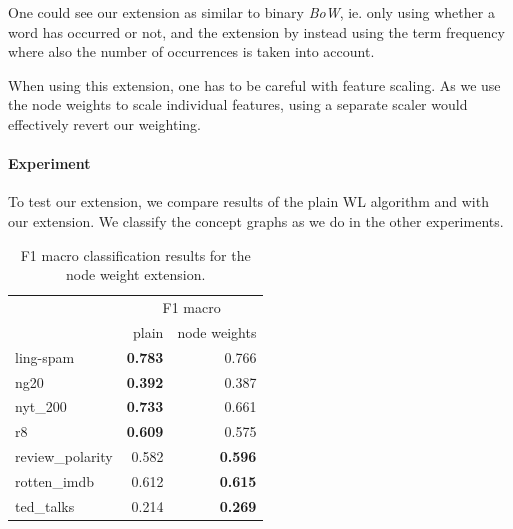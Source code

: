 One could see our extension as similar to binary \textit{BoW}, ie. only using whether a word has occurred or not, and the extension by instead using the term frequency where also the number of occurrences is taken into account.

When using this extension, one has to be careful with feature scaling. As we use the node weights to scale individual features, using a separate scaler would effectively revert our weighting.


\paragraph{Experiment}
To test our extension, we compare results of the plain WL algorithm and with our extension.
We classify the concept graphs as we do in the other experiments.

\begin{table}[htb!]
	\centering
\begin{tabular}{lrr}
	{} & \multicolumn{2}{c}{F1 macro} \\
	{} &  plain &  node weights \\
	\midrule
	ling-spam       & \textbf{0.783} & 0.766 \\
	ng20            & \textbf{0.392} & 0.387 \\
	nyt\_200         & \textbf{0.733} & 0.661 \\
	r8              & \textbf{0.609} & 0.575 \\
	review\_polarity & 0.582 & \textbf{0.596} \\
	rotten\_imdb     & 0.612 & \textbf{0.615} \\
	ted\_talks       & 0.214 & \textbf{0.269} \\
	\bottomrule
\end{tabular}
\caption[Results: Classification using node weight WL extension]{F1 macro classification results for  the node weight extension.}\label{table:wl_node_weight_extension}
\end{table}

